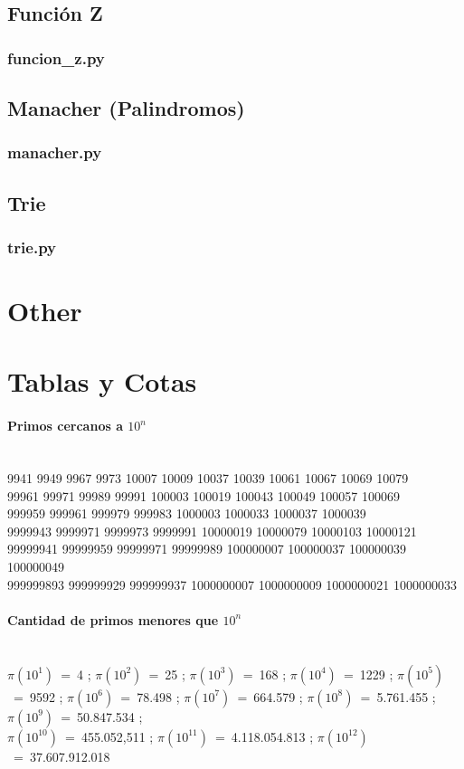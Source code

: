 \documentclass{article}
\newcommand\codefile[2]{    
    \subsubsection{#2}
    
    
}
\begin{document}
\begin{multicols*}{2}
\subsection{Función Z}
\codefile{strings/funcion_z.py}{funcion\_z.py}

\subsection{Manacher (Palindromos)}
\codefile{strings/manacher.py}{manacher.py}

\subsection{Trie}
\codefile{strings/trie.py}{trie.py}

\section{Other}

\section{Tablas y Cotas}
\paragraph{Primos cercanos a $10^n$}\ \\
9941 9949 9967 9973 10007 10009 10037 10039 10061 10067 10069 10079\\
99961 99971 99989 99991 100003 100019 100043 100049 100057 100069\\
999959 999961 999979 999983 1000003 1000033 1000037 1000039\\
9999943 9999971 9999973 9999991 10000019 10000079 10000103 10000121\\
99999941 99999959 99999971 99999989 100000007 100000037 100000039 100000049\\
999999893 999999929 999999937 1000000007 1000000009 1000000021 1000000033

\paragraph{Cantidad de primos menores que $10^n$}\ \\
$\pi(10^1)$~=~4 ;
$\pi(10^2)$~=~25 ;
$\pi(10^3)$~=~168 ;
$\pi(10^4)$~=~1229 ;
$\pi(10^5)$~=~9592 ;
$\pi(10^6)$~=~78.498 ;
$\pi(10^7)$~=~664.579 ;
$\pi(10^8)$~=~5.761.455 ;
$\pi(10^9)$~=~50.847.534 ;\\
$\pi(10^{10})$~=~455.052,511 ;
$\pi(10^{11})$~=~4.118.054.813 ;
$\pi(10^{12})$~=~37.607.912.018
%
%
%

\end{multicols*}
\end{document}

